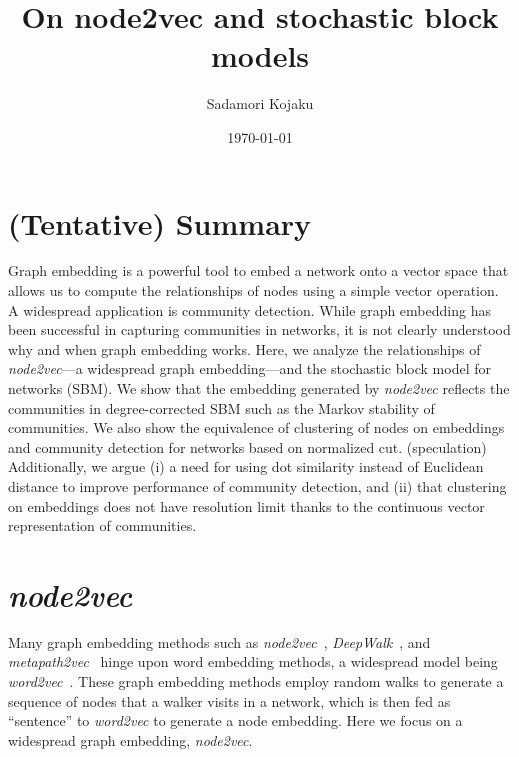 \documentclass[12pt]{article} %
\begin{document}

\title{On node2vec and stochastic block models} %
\date{\today}
\author{Sadamori Kojaku}
\maketitle %

\section*{(Tentative) Summary}

Graph embedding is a powerful tool to embed a network onto a vector space that allows us to compute the relationships of nodes using a simple vector operation.
A widespread application is community detection.
While graph embedding has been successful in capturing communities in networks, it is not clearly understood why and when graph embedding works.
Here, we analyze the relationships of \textit{node2vec}---a widespread graph embedding---and the stochastic block model for networks (SBM).
We show that the embedding generated by \textit{node2vec} reflects the communities in degree-corrected SBM such as the Markov stability of communities.
We also show the equivalence of clustering of nodes on embeddings and community detection for networks based on normalized cut.
(speculation) Additionally, we argue (i) a need for using dot similarity instead of Euclidean distance to improve performance of community detection, and (ii)
that clustering on embeddings does not have resolution limit thanks to the continuous vector representation of communities.

\tableofcontents

\section{\textit{node2vec}}
\label{sec:node2vec}

Many graph embedding methods such as \textit{node2vec}~\cite{Grover2016}, \textit{DeepWalk}~\cite{Perozzi2014}, and \textit{metapath2vec}~\cite{Dong2017} hinge upon word embedding methods, a widespread model being \textit{word2vec}~\cite{Mikolov2013}.
These graph embedding methods employ random walks to generate a sequence of nodes that a walker visits in a network, which is then fed as ``sentence'' to {\it word2vec} to generate a node embedding.
Here we focus on a widespread graph embedding, \textit{node2vec}.
\end{document}
